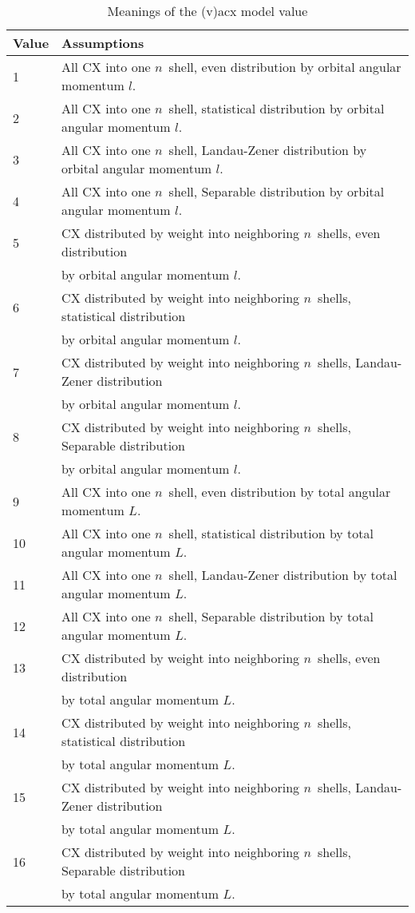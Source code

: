 \documentclass[11pt]{article}
\begin{document}
\pagebreak 

\begin{table}
\caption{Meanings of the (v)acx model value\label{tab:model}}
\begin{tabular}{ll}
\hline \hline Value & Assumptions \\ \hline
1 &All CX into one $n$\ shell, even distribution by orbital angular momentum $l$. \\
2&All CX into one $n$\ shell, statistical distribution by orbital angular momentum $l$. \\
3&All CX into one $n$\ shell, Landau-Zener distribution by orbital angular momentum $l$. \\
4&All CX into one $n$\ shell, Separable distribution by orbital angular momentum $l$. \\  
5&CX distributed by weight into neighboring $n$\ shells, even
distribution \\
 & by orbital angular momentum $l$. \\     
6&CX distributed by weight into neighboring $n$\ shells, statistical
distribution \\
 & by orbital angular momentum $l$. \\
7&CX distributed by weight into neighboring $n$\ shells, Landau-Zener
distribution \\
 & by orbital angular momentum $l$.\\
8&CX distributed by weight into neighboring $n$\ shells, Separable
distribution \\
 & by orbital angular momentum $l$. \\ \hline
9 &All CX into one $n$\ shell, even distribution by total angular momentum $L$. \\
10&All CX into one $n$\ shell, statistical distribution by total angular momentum $L$. \\
11&All CX into one $n$\ shell, Landau-Zener distribution by total angular momentum $L$. \\
12&All CX into one $n$\ shell, Separable distribution by total angular momentum $L$. \\
13&CX distributed by weight into neighboring $n$\ shells, even
distribution \\
 & by total angular momentum $L$. \\
14 &CX distributed by weight into neighboring $n$\ shells, statistical
distribution \\ 
 & by total angular momentum $L$. \\
15&CX distributed by weight into neighboring $n$\ shells, Landau-Zener
distribution \\
& by total angular momentum $L$. \\
16&CX distributed by weight into neighboring $n$\ shells, Separable
distribution \\
 & by total angular momentum $L$. \\
\end{tabular}
\end{table}
\end{document}
